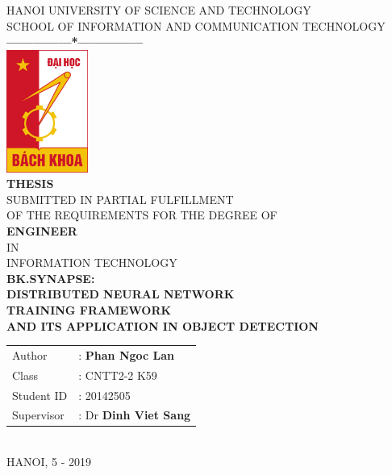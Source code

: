 \documentclass[a4paper, 13pt, oneside]{report}
\begin{document}
\begin{spacing}{1.25}
    \thispagestyle{empty}
    \thisfancypage{\setlength{\fboxrule}{1pt}\doublebox}{}
    \begin{center}
        {\fontsize{17}{20}\selectfont HANOI UNIVERSITY OF SCIENCE AND TECHNOLOGY} \\
        {\fontsize{13}{17}\selectfont SCHOOL OF INFORMATION AND COMMUNICATION TECHNOLOGY} \\ [0.25cm]
        \textbf{---------------*---------------} \\ [1cm]
        \includegraphics[width=0.2\textwidth]{hust.jpeg} \\ [1cm]
        {\fontsize{25}{30}\selectfont \textbf{THESIS}} \\ [0.25cm]
        {\fontsize{14}{17}\selectfont SUBMITTED IN PARTIAL FULFILLMENT \\
        OF THE REQUIREMENTS FOR THE DEGREE OF} \\ [0.5cm]
        {\fontsize{25}{30}\selectfont \textbf{ENGINEER}} \\ [0.5cm]
        {\fontsize{14}{17}\selectfont IN} \\ [0.5cm]
        {\fontsize{22}{26}\selectfont INFORMATION TECHNOLOGY} \\ [0.5cm]
        {\fontsize{15}{15}\selectfont \textbf{BK.SYNAPSE:\\DISTRIBUTED NEURAL NETWORK\\ TRAINING FRAMEWORK\\ AND ITS APPLICATION IN OBJECT DETECTION}}
        \\ [2.25cm]
        \begin{tabular}{ l l }
            Author & : \textbf{Phan Ngoc Lan} \\
            Class & : CNTT2-2 K59 \\
            Student ID & : 20142505 \\ [0.5cm]
            Supervisor & : Dr \textbf{Dinh Viet Sang}
        \end{tabular} \\ [2.25cm]
        {\fontsize{17}{20}\selectfont HANOI, 5 - 2019}
    \end{center}
\end{spacing}
\pagebreak
\end{document}
